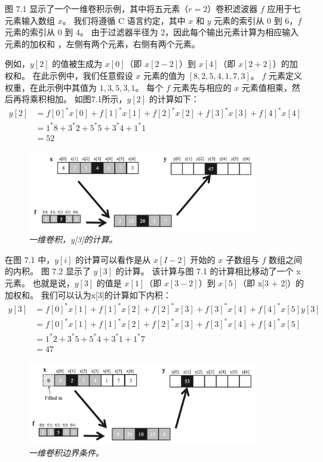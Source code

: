 图 7.1 显示了一个一维卷积示例，其中将五元素（$r = 2$）卷积滤波器 $f$ 应用于七元素输入数组 $x$。 
我们将遵循 C 语言约定，其中 $x$ 和 $y$ 元素的索引从 0 到 6，$f$ 元素的索引从 0 到 4。
由于过滤器半径为 2，因此每个输出元素计算为相应输入元素的加权和 ，左侧有两个元素，右侧有两个元素。

例如，$y[2]$ 的值被生成为 $x[0]$（即 $x[2 - 2]$）到 $x[4]$（即 $x[2 + 2]$）的加权和。 
在此示例中，我们任意假设 $x$ 元素的值为 $[8, 2, 5, 4, 1, 7, 3]$。 
$f$ 元素定义权重，在此示例中其值为 $1, 3, 5, 3, 1$。 
每个 $f$ 元素先与相应的 $x$ 元素值相乘，然后再将乘积相加。 如图7.1所示，$y[2]$ 的计算如下：
$$
\begin{aligned}
y[2] & =f[0]^{*} x[0]+f[1]^{*} x[1]+f[2]^{*} x[2]+f[3]^{*} x[3]+f[4]^{*} x[4] \\
& =1^{*} 8+3^{*} 2+5^{*} 5+3^{*} 4+1^{*} 1 \\
& =52
\end{aligned}
$$

\begin{figure}[H]
	\centering
	\includegraphics[width=0.9\textwidth]{figs/F7.2.png}
	\caption{\textit{一维卷积，y[3]的计算。}}
\end{figure}

在图 7.1 中，$y[i]$ 的计算可以看作是从 $x[I - 2]$ 开始的 $x$ 子数组与 $f$ 数组之间的内积。 
图 7.2 显示了 $y[3]$ 的计算。 该计算与图 7.1 的计算相比移动了一个 x 元素。 
也就是说，$y[3]$ 的值是 $x[1]$（即 $x[3 - 2]$）到 $x[5]$（即 x[3 + 2]）的加权和。 
我们可以认为x[3]的计算如下内积：
$$
\begin{aligned}
y[3] & =f[0]^{*} x[1]+f[1]^{*} x[2]+f[2]^{*} x[3]+f[3]^{*} x[4]+f[4]^{*} x[5] y[3] \\
& =f[0]^{*} x[1]+f[1]^{*} x[2]+f[2]^{*} x[3]+f[3]^{*} x[4]+f[4]^{*} x[5] \\
& =1^{*} 2+3^{*} 5+5^{*} 4+3^{*} 1+1^{*} 7 \\
& =47
\end{aligned}
$$

\begin{figure}[H]
	\centering
	\includegraphics[width=0.9\textwidth]{figs/F7.3.png}
	\caption{\textit{一维卷积边界条件。}}
\end{figure}

